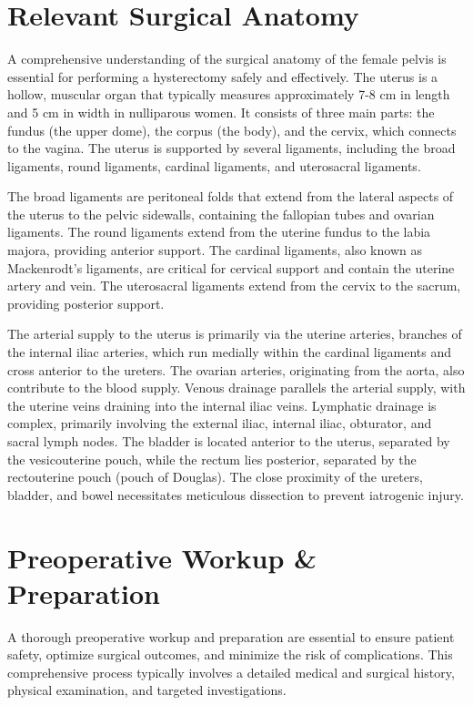\section*{Relevant Surgical Anatomy}
A comprehensive understanding of the surgical anatomy of the female pelvis is essential for performing a hysterectomy safely and effectively. The uterus is a hollow, muscular organ that typically measures approximately 7-8 cm in length and 5 cm in width in nulliparous women. It consists of three main parts: the fundus (the upper dome), the corpus (the body), and the cervix, which connects to the vagina. The uterus is supported by several ligaments, including the broad ligaments, round ligaments, cardinal ligaments, and uterosacral ligaments. 

The broad ligaments are peritoneal folds that extend from the lateral aspects of the uterus to the pelvic sidewalls, containing the fallopian tubes and ovarian ligaments. The round ligaments extend from the uterine fundus to the labia majora, providing anterior support. The cardinal ligaments, also known as Mackenrodt's ligaments, are critical for cervical support and contain the uterine artery and vein. The uterosacral ligaments extend from the cervix to the sacrum, providing posterior support.

The arterial supply to the uterus is primarily via the uterine arteries, branches of the internal iliac arteries, which run medially within the cardinal ligaments and cross anterior to the ureters. The ovarian arteries, originating from the aorta, also contribute to the blood supply. Venous drainage parallels the arterial supply, with the uterine veins draining into the internal iliac veins. Lymphatic drainage is complex, primarily involving the external iliac, internal iliac, obturator, and sacral lymph nodes. The bladder is located anterior to the uterus, separated by the vesicouterine pouch, while the rectum lies posterior, separated by the rectouterine pouch (pouch of Douglas). The close proximity of the ureters, bladder, and bowel necessitates meticulous dissection to prevent iatrogenic injury.

\section*{Preoperative Workup \& Preparation}
A thorough preoperative workup and preparation are essential to ensure patient safety, optimize surgical outcomes, and minimize the risk of complications. This comprehensive process typically involves a detailed medical and surgical history, physical examination, and targeted investigations.


